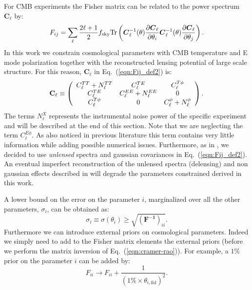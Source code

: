 \documentclass[aps,prd,reprint,superscriptaddress]{revtex4-1}
\newcommand\refeq[1]{Eq.~(\ref{eqn:#1})}
\begin{document}
For CMB experiments the Fisher matrix can be related to the power spectrum $\boldsymbol{C}_\ell$ by:
\begin{equation}
 F_{ij} = \sum_\ell \frac{2\ell+1}{2} f_{\rm sky} {\rm Tr} \left(  \boldsymbol{C}^{-1}_\ell( \theta) \frac{\partial \boldsymbol{C}_\ell}{\partial \theta_i} \boldsymbol{C}^{-1}_\ell( \theta) \frac{\partial \boldsymbol{C}_\ell}{\partial \theta_j}  \right).
 \label{eqn:Fij_def2}
 \end{equation}
In this work we constrain cosmological parameters with CMB temperature and E mode polarization together with the reconstructed lensing potential of large scale structure. For this reason, $\boldsymbol{C}_\ell$ in \refeq{Fij_def2} is:
 \begin{eqnarray}
 	\centering
		\mathbf{C}_\ell \equiv \left( \begin{array}{ccc}C_\ell^{TT} + N_\ell^{TT} & C_\ell^{TE} & C_\ell^{T\phi} \\ C_\ell^{TE} & C_\ell^{EE} + N_\ell^{EE} & 0 \\ C_\ell^{T\phi} & 0 & C_\ell^{\phi} + N_\ell^{\phi}\end{array}\right).
	\label{eqn:cov_definition}
\end{eqnarray}
The terms $N_\ell^{X}$ represents the instrumental noise power of the specific experiment and will be described at the end of this section.
Note that we are neglecting the term $C_\ell^{E\phi}$. As also noticed in previous literature \cite{wu:2014,2013PhRvD..87h3008H} this term contains very little information while adding possible numerical issues.
Furthermore, as in \cite{wu:2014}, we decided to use \textit{unlensed} spectra and gaussian covariances in \refeq{Fij_def2}. An eventual imperfect reconstruction of the unlensed spectra (delensing) and non gaussian effects described in \cite{benoit-levy:2012} will degrade the parameters constrained derived in this work.

A lower bound on the error on the parameter $i$, marginalized over all the other parameters, $\sigma_i$, can be obtained as:
\begin{equation}
\sigma_i \equiv \sigma (\theta_i) \geq \sqrt{(\mathbf{ F^{-1}})_{ii}}.
\label{eqn:cramer-rao}
\end{equation}
Furthermore we can introduce external priors on cosmological parameters.
Indeed we simply need to add to the Fisher matrix elements the external priors (before we perform the matrix inversion of \refeq{cramer-rao}).
For example, a $1\%$ prior on the parameter $i$ can be added by:
\begin{equation}
F_{ii} \rightarrow F_{ii} + \frac{1}{(1\% \times  \theta_{i,\text{fid}})^2}.
\end{equation}
\end{document}
